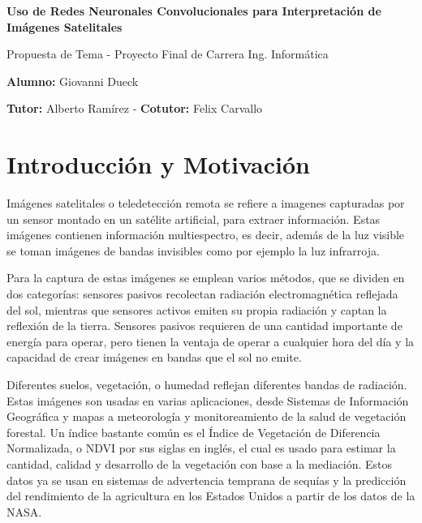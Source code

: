 \documentclass[a4paper, 11pt]{article}
\begin{document}
\begin{center}
    \Large{\bf Uso de Redes Neuronales Convolucionales para Interpretación de Imágenes Satelitales}

    Propuesta de Tema - Proyecto Final de Carrera Ing. Informática

    {\bf Alumno:} Giovanni Dueck

    {\bf Tutor:} Alberto Ramírez - {\bf Cotutor:} Felix Carvallo
\end{center}

\section*{Introducción y Motivación}

Imágenes satelitales o teledetección remota se refiere a imagenes capturadas por un sensor montado en un satélite artificial, para extraer información. Estas imágenes contienen información multiespectro, es decir, además de la luz visible se toman imágenes de bandas invisibles como por ejemplo la luz infrarroja. \autocite{globalforestlink-how-sat-imaging-work}

Para la captura de estas imágenes se emplean varios métodos, que se dividen en dos categorías: sensores pasivos recolectan radiación electromagnética reflejada del sol, mientras que sensores activos emiten su propia radiación y captan la reflexión de la tierra. Sensores pasivos requieren de una cantidad importante de energía para operar, pero tienen la ventaja de operar a cualquier hora del día y la capacidad de crear imágenes en bandas que el sol no emite. \autocite{globalforestlink-how-sat-imaging-work}

Diferentes suelos, vegetación, o humedad reflejan diferentes bandas de radiación. Estas imágenes son usadas en varias aplicaciones, desde Sistemas de Información Geográfica y mapas a meteorología y monitoreamiento de la salud de vegetación forestal. Un índice bastante común es el Índice de Vegetación de Diferencia Normalizada, o NDVI por sus siglas en inglés, el cual es usado para estimar la cantidad, calidad y desarrollo de la vegetación con base a la mediación. Estos datos ya se usan en sistemas de advertencia temprana de sequías y la predicción del rendimiento de la agricultura en los Estados Unidos a partir de los datos de la NASA. \autocite{earthdata-vegetation}
\end{document}
